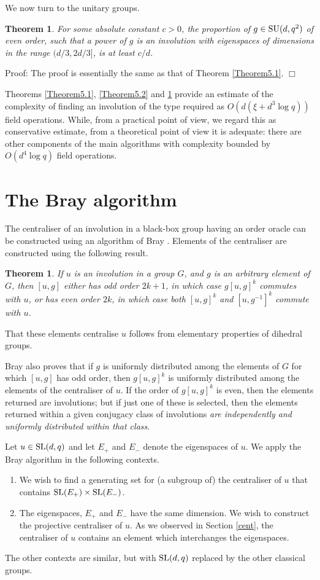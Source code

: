\documentclass[12pt]{article}
\newtheorem{theorem}[definition]{Theorem}
\newenvironment{proof}{\normalsize {\sc Proof}:}{{\hfill $\Box$ \\}}
\def\SL{{\rm SL}}
\def\SU{{\rm SU}}
\begin{document}
We now turn to the unitary groups.
\begin{theorem}\label{Theorem5.3}  For some absolute constant $c>0$, 
the proportion of $g \in \SU(d,q^2)$ of even order, such that a power of $g$
is an involution with eigenspaces of dimensions in the range
$(d/3,2d/3]$, is at least $c/d $.
\end{theorem}
\begin{proof} 
The proof is essentially the same as that of Theorem \ref{Theorem5.1}.
\end{proof}

Theorems \ref{Theorem5.1}, \ref{Theorem5.2} and \ref{Theorem5.3} 
provide an estimate of the
complexity of finding an involution of the type required 
as $O(d(\xi + d^3 \log q))$
field operations. While, from a practical point of view, we regard this
as conservative estimate, from a theoretical point of view it is
adequate: there are other components of the main
algorithms with complexity bounded by $O(d^4 \log q)$ field operations. 

\section{The Bray algorithm}
\label{Bray}

The centraliser of an involution in a black-box group having an order
oracle can be constructed using an algorithm of Bray \cite{Bray}. 
Elements of the centraliser are constructed using the following result.
\begin{theorem}
\label{thm:bray}
If $u$ is an involution in a group $G$, and $g$ is an arbitrary element of $G$,
then $[u,g]$ either has odd order $2k+1$, in which case
$g[u,g]^k$ commutes with $u$, or has even order $2k$, in which case
both $[u,g]^k$ and $[u,g^{-1}]^k$ commute with $u$.
\end{theorem}
That these elements centralise $u$ follows from elementary
properties of dihedral groups. 

Bray \cite{Bray} also proves that if $g$ is uniformly
distributed among the elements of $G$ for which $[u,g]$
has odd order, then $g[u,g]^k$ is uniformly distributed among the
elements of the centraliser of $u$. If the order of $g[u,g]^k$ is even, 
then the elements returned are involutions; but if just
one of these is selected, then the elements returned
within a given conjugacy class of involutions {\it are independently
and uniformly distributed within that class}. 

Let $u \in \SL(d, q)$ and let $E_+$ and $E_-$ denote the 
eigenspaces of $u$.
We apply the Bray algorithm in the following contexts. 
\begin{enumerate}
\item 
We wish to find a generating set for (a subgroup of) the centraliser 
of $u$ that contains $\SL(E_+)\times \SL(E_-)$. 
\item 
The eigenspaces, $E_+$ and $E_-$ have the same dimension. 
We wish to construct the projective centraliser of $u$.
As we observed in Section \ref{cent}, the centraliser 
of $u$ contains an element which interchanges the eigenspaces.
\end{enumerate}
The other contexts are similar, but with $\SL(d,q)$ 
replaced by the other classical groups. 
\end{document}
